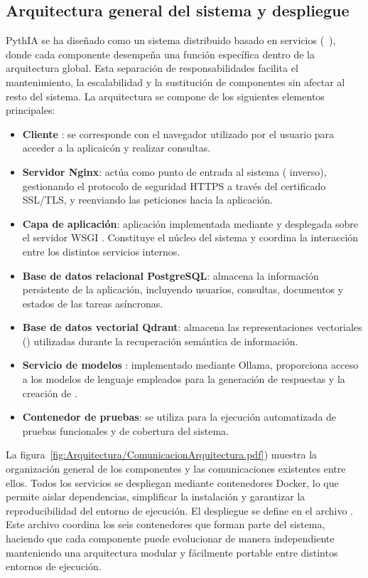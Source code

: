 \subsection{Arquitectura general del sistema y despliegue}
PythIA se ha diseñado como un sistema distribuido basado en servicios (~\cite{diseño:SOA}), donde cada componente desempeña una función específica dentro de la arquitectura global. Esta separación de responsabilidades facilita el mantenimiento, la escalabilidad y la sustitución de componentes sin afectar al resto del sistema. La arquitectura se compone de los siguientes elementos principales:
\begin{itemize}
	\item \textbf{Cliente }: se corresponde con el navegador utilizado por el usuario para acceder a la aplicaicón y realizar consultas.
	\item \textbf{Servidor Nginx}: actúa como punto de entrada al sistema ( inverso), gestionando el protocolo de seguridad HTTPS a través del certificado SSL/TLS, y reenviando las peticiones hacia la aplicación.		
	\item \textbf{Capa de aplicación}: aplicación  implementada mediante  y desplegada sobre el servidor WSGI . Constituye el núcleo del sistema y coordina la interacción entre los distintos servicios internos.
	\item \textbf{Base de datos relacional PostgreSQL}: almacena la información persistente de la aplicación, incluyendo usuarios, consultas, documentos y estados de las tareas asíncronas. 
	\item \textbf{Base de datos vectorial Qdrant}: almacena las representaciones vectoriales () utilizadas durante la recuperación semántica de información.	
	\item \textbf{Servicio de modelos }: implementado mediante Ollama, proporciona acceso a los modelos de lenguaje empleados para la generación de respuestas y la creación de .
	\item \textbf{Contenedor de pruebas}: se utiliza para la ejecución automatizada de pruebas funcionales y de cobertura del sistema.
\end{itemize}

La figura~\ref{fig:Arquitectura/ComunicacionArquitectura.pdf}) muestra la organización general de los componentes y las comunicaciones existentes entre ellos. Todos los servicios se despliegan mediante contenedores Docker, lo que permite aislar dependencias, simplificar la instalación y garantizar la reproducibilidad del entorno de ejecución. El despliegue se define en el archivo . Este archivo coordina los seis contenedores que forman parte del sistema,  haciendo que cada componente puede evolucionar de manera independiente manteniendo una arquitectura modular y fácilmente portable entre distintos entornos de ejecución.

